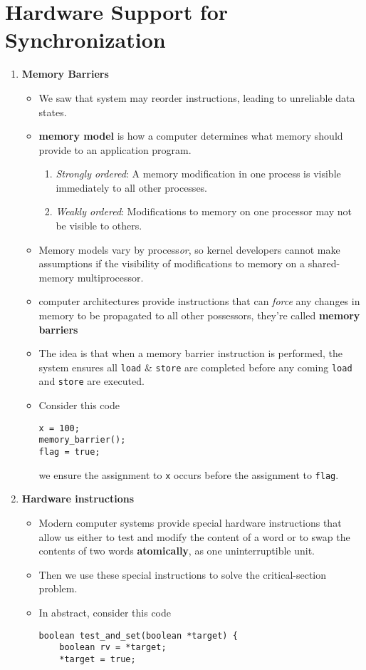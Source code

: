 \documentclass{report}
\def\code#1{\texttt{#1}}
\begin{document}
\section{Hardware Support for Synchronization}%
\begin{enumerate}
	\item \textbf{Memory Barriers}
	      \begin{itemize}
		      \item We saw that system may reorder instructions, leading to unreliable data states.
		      \item \textbf{memory model} is how a computer determines what memory should provide to an application
		            program.
		            \begin{enumerate}
			            \item \textit{Strongly ordered}: A memory modification in one process is visible immediately to all other processes.
			            \item \textit{Weakly ordered}: Modifications to memory on one processor may not be visible to others.
		            \end{enumerate}
		      \item Memory models vary by process\textit{or}, so kernel developers cannot make assumptions if the visibility of
		            modifications to memory on a shared-memory multiprocessor.
		      \item computer architectures provide instructions that can \textit{force} any changes in memory to be propagated
		            to all other possessors, they're called \textbf{memory barriers}
		      \item The idea is that when a memory barrier instruction is performed, the system ensures all \code{load} \&
		            \code{store} are completed before any coming \code{load} and \code{store} are executed.
		      \item Consider this code
		            \begin{verbatim}
x = 100;
memory_barrier();
flag = true;
\end{verbatim}
		            we ensure the assignment to \code{x} occurs before the assignment to \code{flag}.
	      \end{itemize}
	\item \textbf{Hardware instructions}
	      \begin{itemize}
		      \item Modern computer systems provide special hardware instructions that allow us either to test and modify the content of a word or
		            to swap the contents of two words \textbf{atomically}, as one uninterruptible unit.
		      \item  Then we use these special instructions to solve the critical-section problem.
		      \item In abstract, consider this code
		            \begin{verbatim}
boolean test_and_set(boolean *target) {
    boolean rv = *target;
    *target = true;


\end{verbatim}
\end{itemize}
\end{enumerate}
\end{document}
